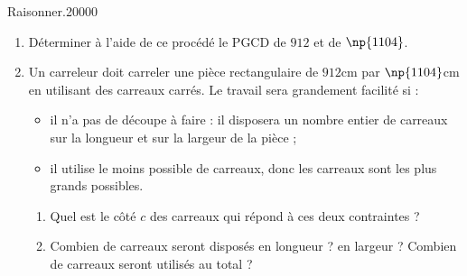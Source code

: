 \begin{pageAuto}
\begin{ExoAutoN}{Raisonner.}{2}{0}{0}{0}{0}
\begin{enumerate}[leftmargin=*]
\item Déterminer à l'aide de ce procédé le PGCD de $912$ et de $\np{1104}$. 
\item 
  Un carreleur doit carreler une pièce rectangulaire de $912$cm par
  $\np{1104}$cm
  en utilisant des carreaux carrés. Le travail sera grandement facilité
  si :
  \begin{itemize}
  \item il n'a pas de découpe à faire : il disposera un nombre entier
    de carreaux sur la longueur et sur la largeur de la pièce ;
  \item il utilise le moins possible de carreaux, donc les carreaux
    sont les plus grands possibles.
    
  \end{itemize}
  \begin{enumerate}
  \item Quel est le côté $c$ des carreaux qui répond à ces deux contraintes ?
  \item Combien de carreaux seront disposés en longueur ? en largeur ?
    Combien de carreaux seront utilisés au total ?
  \end{enumerate}
\end{enumerate}
\end{ExoAutoN}

\end{pageAuto}
